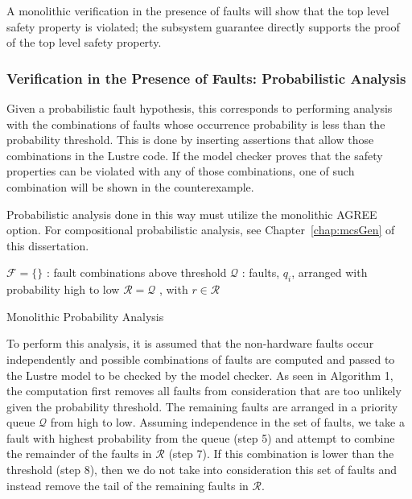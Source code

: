 A monolithic verification in the presence of faults will show that the top level safety property is violated; the subsystem guarantee directly supports the proof of the top level safety property. 

\subsubsection{Verification in the Presence of Faults: Probabilistic Analysis} 
Given a probabilistic fault hypothesis, this corresponds to performing analysis with the combinations of faults whose occurrence probability is less than the probability threshold. This is done by inserting assertions that allow those combinations in the Lustre code. If the model checker proves that the safety properties can be violated with any of those combinations, one of such combination will be shown in the counterexample. 

Probabilistic analysis done in this way must utilize the monolithic AGREE option. For compositional probabilistic analysis, see Chapter~\ref{chap:mcsGen} of this dissertation.

\begin{algorithm}[H]
	$\mathcal{F} = \{\}$ : fault combinations above threshold \;
	$\mathcal{Q}$ : faults, $q_i$, arranged with probability high to low \;
	$\mathcal{R} = \mathcal{Q}$ , with $r \in \mathcal{R}$\;
	\caption{Monolithic Probability Analysis}
	\label{alg:prob_monolithic}
\end{algorithm}

To perform this analysis, it is assumed that the non-hardware faults occur independently and possible combinations of faults are computed and passed to the Lustre model to be checked by the model checker. As seen in Algorithm 1, the computation first removes all faults from consideration that are too unlikely given the probability threshold. The remaining faults are arranged in a priority queue $\mathcal{Q}$ from high to low. Assuming independence in the set of faults, we take a fault with highest probability from the queue (step 5) and attempt to combine the remainder of the faults in $\mathcal{R}$ (step 7). If this combination is lower than the threshold (step 8), then we do not take into consideration this set of faults and instead remove the tail of the remaining faults in $\mathcal{R}$. 
 
